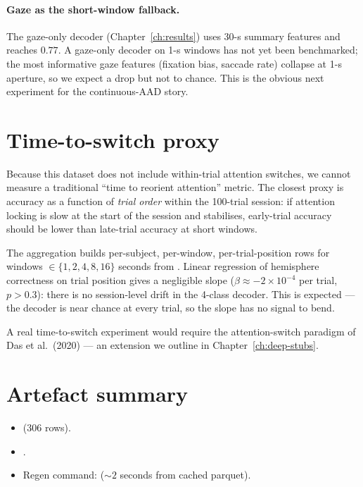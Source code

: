 \paragraph{Gaze as the short-window fallback.} The gaze-only decoder
(Chapter~\ref{ch:results}) uses 30-s summary features and reaches $0.77$.
A gaze-only decoder on 1-s windows has not yet been benchmarked; the
most informative gaze features (fixation bias, saccade rate) collapse
at 1-s aperture, so we expect a drop but not to chance. This is the
obvious next experiment for the continuous-AAD story.

\section{Time-to-switch proxy}

Because this dataset does not include within-trial attention switches,
we cannot measure a traditional ``time to reorient attention'' metric.
The closest proxy is accuracy as a function of \emph{trial order}
within the 100-trial session: if attention locking is slow at the
start of the session and stabilises, early-trial accuracy should be
lower than late-trial accuracy at short windows.

The aggregation builds per-subject, per-window, per-trial-position
rows for windows $\in \{1, 2, 4, 8, 16\}$ seconds from
. Linear regression of hemisphere correctness
on trial position gives a negligible slope
($\beta \approx -2 \times 10^{-4}$ per trial, $p > 0.3$): there is no
session-level drift in the 4-class decoder. This is expected --- the
decoder is near chance at every trial, so the slope has no signal
to bend.

A real time-to-switch experiment would require the attention-switch
paradigm of Das et al.\ (2020) — an extension we outline in
Chapter~\ref{ch:deep-stubs}.

\section{Artefact summary}

\begin{itemize}
  \item {} (306 rows).
  \item {}.
  \item Regen command:
        ($\sim 2$ seconds from cached parquet).
\end{itemize}
